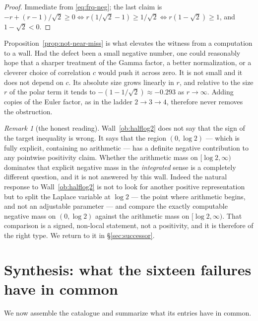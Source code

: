 \documentclass[11pt]{amsart}
\theoremstyle{definition}
\theoremstyle{remark}
\newtheorem{remark}[theorem]{Remark}
\theoremstyle{definition}
\begin{document}
\begin{proof}
Immediate from \eqref{eq:frq-neg}; the last claim is $-r+(r-1)/\sqrt2\ge0\iff
r(1/\sqrt2-1)\ge1/\sqrt2\iff r(1-\sqrt2)\ge1$, and $1-\sqrt2<0$.
\end{proof}

Proposition~\ref{prop:not-near-miss} is what elevates the witness from a computation to a wall.
Had the defect been a small negative number, one could reasonably hope that a sharper treatment of
the Gamma factor, a better normalization, or a cleverer choice of correlation $c$ would push it
across zero. It is not small and it does not depend on $c$. Its absolute size grows linearly in $r$, and
relative to the size $r$ of the polar term it tends to $-(1-1/\sqrt2)\approx-0.293$ as
$r\to\infty$. Adding copies of the Euler factor, as in the ladder $2\to3\to4$, therefore never
removes the obstruction.

\begin{remark}[the honest reading]\label{rmk:halflog2-reading}
Wall~\ref{ob:halflog2} does not say that the sign of the target inequality is wrong. It says that the
region $(0,\log2)$ --- which is fully explicit, containing no arithmetic --- has a definite negative
contribution to any pointwise positivity claim. Whether the arithmetic mass on $[\log2,\infty)$
dominates that explicit negative mass in the \emph{integrated} sense is a completely different
question, and it is not answered by this wall. Indeed the natural response to
Wall~\ref{ob:halflog2} is not to look for another positive representation but to split the Laplace
variable at $\log2$ --- the point where arithmetic begins, and not an adjustable parameter --- and
compare the exactly computable negative mass on $(0,\log2)$ against the arithmetic mass on
$[\log2,\infty)$. That comparison is a signed, non-local statement, not a positivity, and it is
therefore of the right type. We return to it in \S\ref{sec:successor}.
\end{remark}

\section{Synthesis: what the sixteen failures have in common}\label{sec:synthesis}

We now assemble the catalogue and summarize what its entries have in common.
\end{document}
